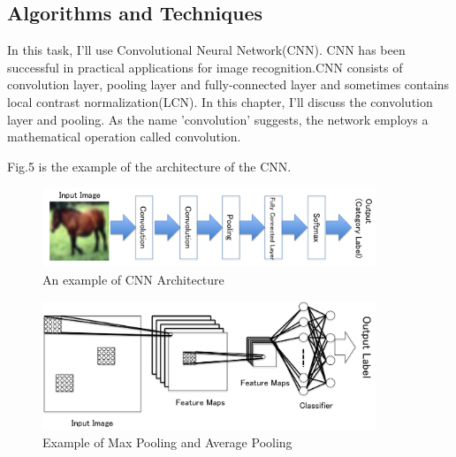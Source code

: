 \subsection{Algorithms and Techniques}

In this task, I'll use Convolutional Neural Network(CNN). CNN has been successful in  practical applications for image recognition.CNN consists of convolution layer, pooling layer and fully-connected layer and sometimes contains local contrast normalization(LCN). In this chapter, I'll discuss the convolution layer and pooling.
As the name 'convolution' suggests, the network employs a mathematical operation called convolution. \cite{Deep Learning}\cite{Deep Learning2}

Fig.5 is the example of the architecture of the CNN.
\begin{figure}[htbp]

	\begin{center}
	\includegraphics[width=10cm]{picture/Architecture_of_CNN.png}
	\caption{An example of CNN Architecture}
	\end{center}
	\label{fig:five}

\end{figure}




\begin{figure}[htbp]

	\begin{center}
	\includegraphics[width=10cm]{picture/Structure_of_convolution.png}
	\caption{Example of Max Pooling and Average Pooling}
	\end{center}
	\label{fig:six}

\end{figure}

